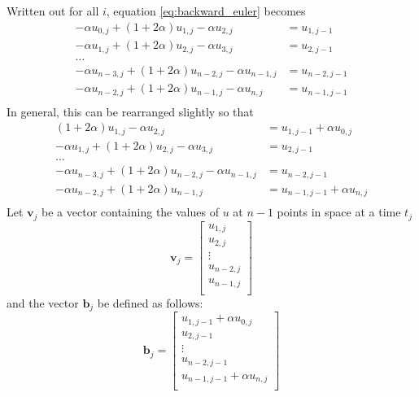 \documentclass[reprint, english,notitlepage,nofootinbib]{revtex4-1}  %
\newcommand{\vc}[1]{\mathbf{#1}}
\begin{document}
Written out for all $i$, equation \ref{eq:backward_euler} becomes
\begin{align*}
  - \alpha u_{0, j} + (1 + 2 \alpha) u_{1, j} - \alpha u_{2, j} &= u_{1, j-1} \\
  - \alpha u_{1, j} + (1 + 2 \alpha) u_{2, j} - \alpha u_{3, j} &= u_{2, j-1} \\
  ... \\
  - \alpha u_{n-3, j} + (1 + 2 \alpha) u_{n-2, j} - \alpha u_{n-1, j} &= u_{n-2, j-1} \\
  - \alpha u_{n-2, j} + (1 + 2 \alpha) u_{n-1, j} - \alpha u_{n, j} &= u_{n-1, j-1} \\
\end{align*}
In general, this can be rearranged slightly so that
\begin{align*}
  (1 + 2 \alpha) u_{1, j} -\alpha  u_{2, j} &= u_{1, j-1} + \alpha u_{0, j} \\
  - \alpha u_{1, j} + (1 + 2 \alpha) u_{2, j} - \alpha u_{3, j} &= u_{2, j-1} \\
  ... \\
  - \alpha u_{n-3, j} + (1 + 2 \alpha) u_{n-2, j} - \alpha u_{n-1, j} &= u_{n-2, j-1} \\
  - \alpha u_{n-2, j} + (1 + 2 \alpha) u_{n-1, j} &= u_{n-1, j-1} + \alpha u_{n, j} \\
\end{align*}
Let $\vc v_j$ be a vector containing the values of $u$ at $n - 1$ points in space at a time $t_j$
\begin{equation}
  \label{def:vector_v}
  \vc v_j =
  \begin{bmatrix}
    u_{1, j} \\
    u_{2, j} \\
    \vdots \\
    u_{n-2, j} \\
    u_{n-1, j} \\
  \end{bmatrix}
\end{equation}
and the vector $\vc b_j$ be defined as follows:
\begin{equation}
  \label{def:vector_b_BackwardEuler}
  \vc b_j =
  \begin{bmatrix}
    u_{1, j-1} + \alpha u_{0, j} \\
    u_{2, j-1} \\
    \vdots \\
    u_{n-2, j-1} \\
    u_{n-1, j-1} + \alpha u_{n, j} \\
  \end{bmatrix}
\end{equation}
\end{document}

